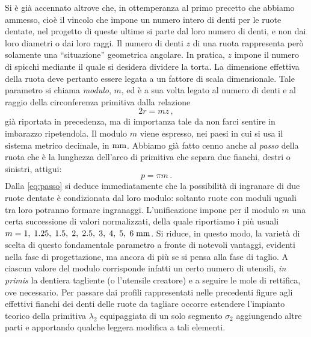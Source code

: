 \noindent Si \`e gi\`a accennato altrove che, in ottemperanza al primo
precetto che abbiamo ammesso, cio\`e il vincolo  che impone un
numero intero di denti per le ruote dentate, nel progetto di queste ultime
si parte dal loro numero di denti, e non dai loro diametri o dai loro raggi.
Il numero di denti $z$ di una ruota rappresenta per\`o solamente una
``situazione'' geometrica angolare. In pratica, $z$ impone il
numero di spicchi mediante il quale si desidera
dividere la torta. La dimensione effettiva della
ruota deve pertanto essere legata a un fattore di scala dimensionale.
Tale parametro si chiama {\em modulo}, $m$, ed \`e
a sua volta legato al numero di denti e al raggio della circonferenza primitiva
 dalla relazione
\begin{equation}
2 r =mz\,,
\label{eq:mod_z}
\end{equation}
\noindent gi\`a riportata in precedenza, ma di importanza tale da non
farci sentire in imbarazzo ripetendola. Il modulo $m$ viene espresso,
nei paesi in cui si usa il sistema metrico decimale, in ${\rm mm}$. Abbiamo 
gi\`a fatto cenno anche al {\em passo} della ruota che \`e
la lunghezza dell'arco di primitiva che separa due fianchi, destri o sinistri,
attigui:
\begin{equation}
p=\pi m\,.
\label{eq:passo}
\end{equation}
\noindent Dalla \ref{eq:passo} si deduce immediatamente che la possibilit\`a
di ingranare di due ruote dentate \`e condizionata dal loro modulo:
soltanto ruote con moduli uguali tra loro potranno formare ingranaggi.
L'unificazione impone per il modulo $m$ una certa successione di valori
normalizzati, della quale riportiamo i pi\`u usuali
$m=1,\;1.25,\;1.5,\;2,\;2.5,\;3,\;4,\;5,\;6\; {\rm mm}$.
Si riduce, in questo modo, la variet\`a di scelta di questo fondamentale
parametro a fronte
di notevoli vantaggi, evidenti nella fase di progettazione,
ma ancora di pi\`u se si pensa alla fase di taglio.
A ciascun valore del modulo corrisponde infatti un certo numero di utensili,
{\em in primis} la dentiera tagliente (o l'utensile creatore)
 e a seguire le mole di rettifica,
ove necessario.
Per passare dai profili rappresentati nelle precedenti figure
agli effettivi fianchi dei denti delle ruote da
tagliare occorre estendere l'impianto teorico della primitiva $\lambda_2$
equipaggiata di un solo segmento $\sigma_2$ aggiungendo altre parti e
apportando qualche leggera modifica a tali elementi.
